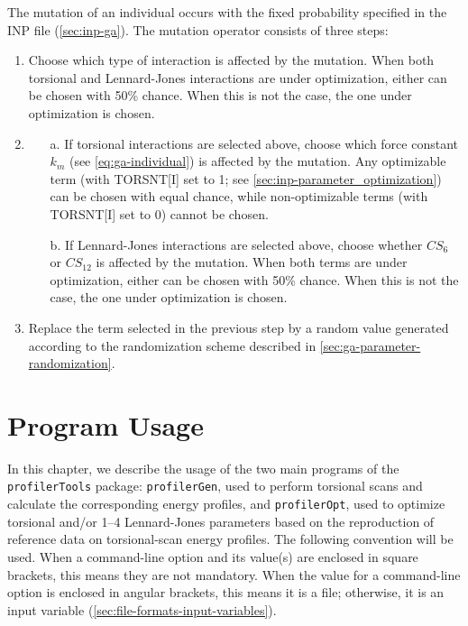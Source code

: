 \documentclass[10pt,a4paper,openany]{memoir}
\numberwithin{equation}{section}
\newcommand{\profileropt}[0]{\texttt{profilerOpt}}
\newcommand{\profilergen}[0]{\texttt{profilerGen}}
\newcommand{\profilertools}[0]{\texttt{profilerTools}}
\begin{document}
The mutation of an individual occurs with the fixed probability specified in the
INP file (\autoref{sec:inp-ga}). The mutation operator
consists of three steps:
\begin{enumerate}
\item Choose which type of interaction is affected by the mutation.  When both
  torsional and Lennard-Jones interactions are under optimization, either can be
  chosen with 50\% chance.  When this is not the case, the one under
  optimization is chosen.
\item
  \begin{enumerate}
  \item [a.] If torsional interactions are selected above, choose
    which force constant $k_m$ (see \autoref{eq:ga-individual}) is
    affected by the mutation. Any optimizable term (with TORSNT[I] set
    to 1; see \autoref{sec:inp-parameter_optimization}) can be chosen with equal
    chance, while non-optimizable terms (with TORSNT[I] set to 0)
    cannot be chosen.
  \item [b.] If Lennard-Jones interactions are selected above, choose whether $CS_6$ or
    $CS_{12}$ is affected by the mutation. When both terms are under
    optimization, either can be chosen with 50\% chance. When this is not the
    case, the one under optimization is chosen.
  \end{enumerate}
\item Replace the term selected in the previous step by a random value generated
  according to the randomization scheme described in
  \autoref{sec:ga-parameter-randomization}.
\end{enumerate}

\chapter{Program Usage}
\label{chap:program-usage}

In this chapter, we describe the usage of the two main programs of the \profilertools{} package:
\profilergen{}, used to perform torsional scans and calculate the corresponding energy profiles, and
\profileropt{}, used to optimize torsional and/or 1--4 Lennard-Jones parameters based on the reproduction of reference data on torsional-scan energy profiles.
The following convention will be used.
When a command-line option and its value(s) are enclosed in square brackets, this means they are not mandatory.
When the value for a command-line option is enclosed in angular brackets, this means it is a file;
otherwise, it is an input variable (\autoref{sec:file-formats-input-variables}).
\end{document}
